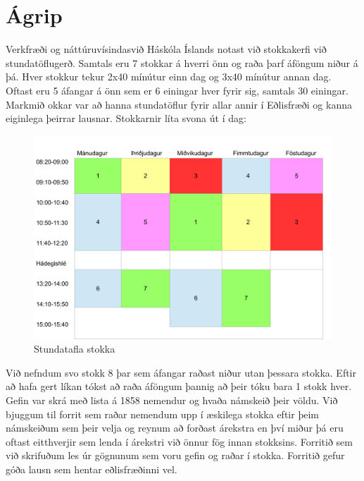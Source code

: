 \documentclass[a4paper,12pt]{article}
\begin{document}
\section{Ágrip}
Verkfræði og náttúruvísindasvið Háskóla Íslands notast við stokkakerfi við stundatöflugerð. Samtals eru 7 stokkar á hverri önn og raða þarf áföngum niður á þá. Hver stokkur tekur 2x40 mínútur einn dag og 3x40 mínútur annan dag. Oftast eru 5 áfangar á önn sem er 6 einingar hver fyrir sig, samtals 30 einingar. Markmið okkar var að hanna stundatöflur fyrir allar annir í Eðlisfræði og kanna eiginlega þeirrar lausnar. Stokkarnir líta svona út í dag:
\begin{figure}[ht!]
\centering
\includegraphics[scale=0.3]{stundatafla}
\caption{Stundatafla stokka}
\label{fig: stundatafla}
\end{figure}

Við nefndum svo stokk 8 þar sem áfangar raðast niður utan þessara stokka. Eftir að hafa gert líkan tókst að raða áföngum þannig að þeir tóku bara 1 stokk hver. Gefin var skrá með lista á 1858 nemendur og hvaða námskeið þeir völdu. Við bjuggum til forrit sem raðar nemendum upp í æskilega stokka eftir þeim námskeiðum sem þeir velja og reynum að forðast árekstra en því miður þá eru oftast eitthverjir sem lenda í árekstri við önnur fög innan stokksins. Forritið sem við skrifuðum les úr gögnunum sem voru gefin og raðar í stokka. Forritið gefur góða lausn sem hentar eðlisfræðinni vel.
\end{document}
